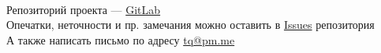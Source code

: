 \tableofcontents
{}
\vfill ~
\begin{center}
Репозиторий проекта --- \href{https://gitlab.com/tiulpin/plt}{GitLab} \\
Опечатки, неточности и пр. замечания можно оставить в \href{https://gitlab.com/tiulpin/plt/issues}{Issues} репозитория\\
А также написать письмо по адресу \href{mailto:tq@pm.me}{tq@pm.me}
\end{center}
